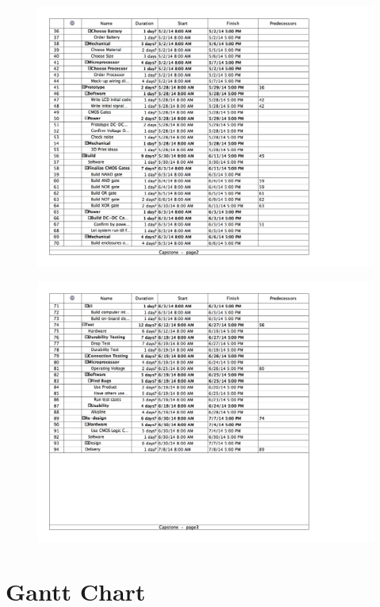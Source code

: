 \documentclass[12pt]{report}
\begin{document}
\newpage
\begin{figure}[h!]
\begin{center}
	\includegraphics[width=\textwidth]{Schedule2}
\label{default}
\end{center}
\end{figure}

\newpage
\begin{figure}[h!]
\begin{center}
	\includegraphics[width=\textwidth]{Schedule3}
\label{default}
\end{center}
\end{figure}


\newpage
\section*{Gantt Chart}
\end{document}
